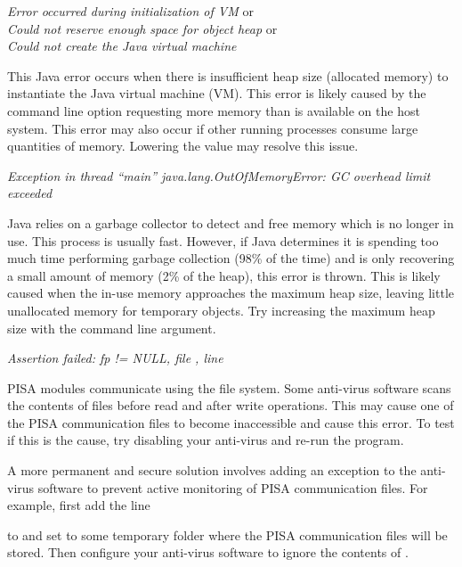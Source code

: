 \noindent
\textit{Error occurred during initialization of VM} or\\
\textit{Could not reserve enough space for object heap} or\\
\textit{Could not create the Java virtual machine}
\begin{indented}
  This Java error occurs when there is insufficient heap size (allocated memory) to instantiate the Java virtual machine (VM).  This error is likely caused by the  command line option requesting more memory than is available on the host system.  This error may also occur if other running processes consume large quantities of memory.  Lowering the  value may resolve this issue.
\end{indented}

\noindent
\textit{Exception in thread ``main'' java.lang.OutOfMemoryError: GC overhead limit exceeded}
\begin{indented}
  Java relies on a garbage collector to detect and free memory which is no longer in use.  This process is usually fast.  However, if Java determines it is spending too much time performing garbage collection (98\% of the time) and is only recovering a small amount of memory (2\% of the heap), this error is thrown.  This is likely caused when the in-use memory approaches the maximum heap size, leaving little unallocated memory for temporary objects.  Try  increasing the maximum heap size with the  command line argument.
\end{indented}

\noindent
\textit{Assertion failed: fp != NULL, file , line }
\begin{indented}
  PISA modules communicate using the file system.  Some anti-virus software scans the contents of files before read and after write operations.  This may cause one of the PISA communication files to become inaccessible and cause this error.  To test if this is the cause, try disabling your anti-virus and re-run the program.
  
  A more permanent and secure solution involves adding an exception to the anti-virus software to prevent active monitoring of PISA communication files. For example, first add the line
  \begin{indented}
  \end{indented}
  to  and set  to some temporary folder where the PISA communication files will be stored.  Then configure your anti-virus software to ignore the contents of .
\end{indented}

